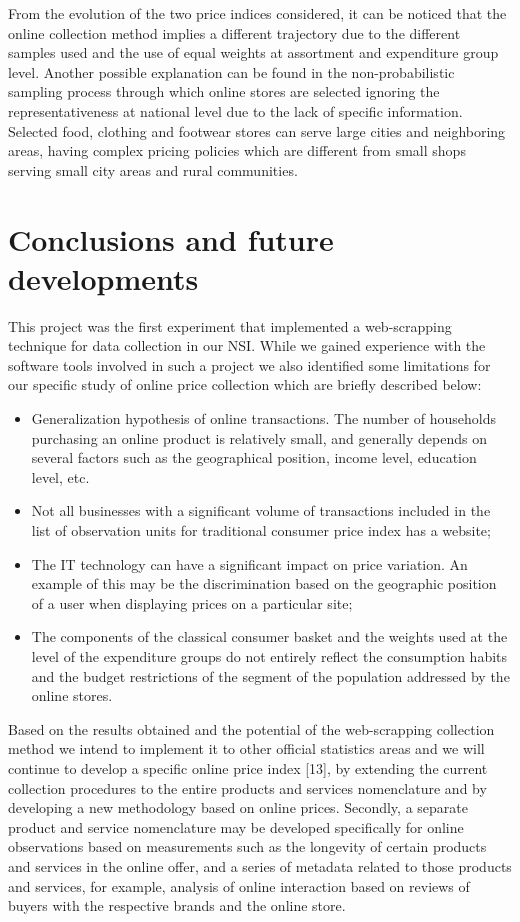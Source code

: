 \documentclass[]{article}
\begin{document}
From the evolution of the two price indices considered, it can be noticed that the online 
collection method implies a different trajectory due to the different samples used and the use 
of equal weights at assortment and expenditure group level. Another possible explanation can be found 
in the non-probabilistic sampling process through which online stores are selected ignoring the 
representativeness at national level due to the lack of specific information. Selected food, 
clothing and footwear stores can serve large cities and neighboring areas, having complex pricing 
policies which are different from small shops serving small city areas and rural communities.


\section{Conclusions and future developments}

This project was the first experiment that implemented a web-scrapping technique for data collection 
in our NSI. While we gained experience with the software tools involved in such a project we also 
identified some limitations for our specific study of online price collection which are briefly described below:
\begin{itemize}
	\item Generalization hypothesis of online transactions. The number of households purchasing an 
	online product is relatively small, and generally depends on several factors such as the geographical position, 
	income level, education level, etc.
	\item Not all businesses with a significant volume of transactions included in the list of observation 
	units for traditional consumer price index has a website;
	\item The IT technology can have a significant impact on price variation. An example of this may be the discrimination 
	based on the geographic position of a user when displaying prices on a particular site;
	\item The components of the classical consumer basket and the weights used at the level of the expenditure groups do not entirely reflect the consumption habits and the budget restrictions of the segment of the population addressed by the online stores.
\end{itemize}


Based on the results obtained and the potential of the web-scrapping collection method we intend to implement 
it to other official statistics areas and we will continue to develop a specific online price index [13], 
by extending the current collection procedures to the entire products and services nomenclature and by 
developing a new methodology based on online prices. Secondly, a separate product and service nomenclature may 
be developed specifically for online observations based on measurements such as the longevity of certain products 
and services in the online offer, and a series of metadata related to those products and services, for example, analysis of 
online interaction based on reviews of buyers with the respective brands and the online store.
\end{document}
